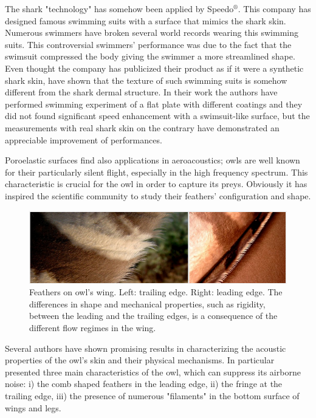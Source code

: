 The shark "technology" has somehow been applied by Speedo$^{\circledR}$. This company has designed famous swimming suits with a surface that mimics the shark skin. Numerous swimmers have broken several world records wearing this swimming suits.
This controversial swimmers' performance was due to the fact that the swimsuit compressed the body giving the swimmer a more streamlined shape.
Even thought the company has publicized their product as if it were a synthetic shark skin, \citet{Oeffner785} have shown that the texture of such swimming suits is somehow different from the shark dermal structure.
In their work the authors have performed swimming experiment of a flat plate with different coatings and they did not found significant speed enhancement with a swimsuit-like surface, but the measurements with real shark skin on the contrary have demonstrated an appreciable improvement of performances.

Poroelastic surfaces find also applications in aeroacoustics; owls are well known for their particularly silent flight, especially in the high frequency spectrum.
This characteristic is crucial for the owl in order to capture its preys.
Obviously it has inspired the scientific community to study their feathers' configuration and shape.

\begin{figure}[h]
	\centering
	\includegraphics[width=0.8\linewidth]{chapter_1/howl}
	\caption{Feathers on owl's wing. Left: trailing edge. Right: leading edge. The differences in shape and mechanical properties, such as rigidity, between the leading and the trailing edges, is a consequence of the different flow regimes in the wing.}
	\label{fig:owl}
\end{figure}
 
Several authors have shown promising results in characterizing the acoustic properties of the owl's skin and their physical mechanisms.
In particular \citet{lilley1998} presented three main characteristics of the owl, which can suppress its airborne noise: i) the comb shaped feathers in the leading edge, ii) the fringe at the trailing edge, iii) the presence of numerous "filaments" in the bottom surface of wings and legs.

